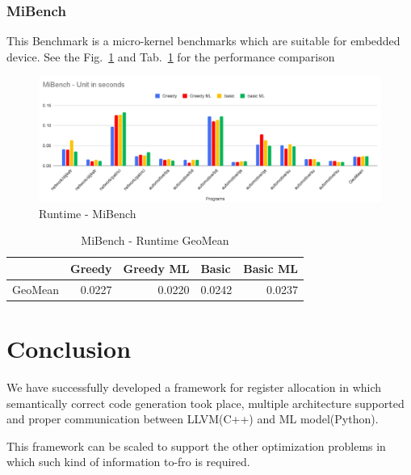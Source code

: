 \subsubsection{MiBench}
This Benchmark is a micro-kernel benchmarks which are suitable for embedded device.  See the Fig.~\ref{fig:mlra-mibench} and Tab.~\ref{tab:mlra:mibench} for the performance comparison

\begin{figure}[t]
    \centering
    \includegraphics[scale=0.4]{figures/chapter-5/MiBench.png}
    \caption{Runtime - MiBench}
     \label{fig:mlra-mibench}
\end{figure}

\begin{table}[h]
\begin{tabular}{|l|l|l|l|l|}
\hline
 & \textbf{Greedy} & \textbf{Greedy ML} & \textbf{Basic} & \textbf{Basic ML} \\ \hline
GeoMean & \multicolumn{1}{r|}{0.0227} & \multicolumn{1}{r|}{0.0220} & \multicolumn{1}{r|}{0.0242} & \multicolumn{1}{r|}{0.0237} \\ \hline
\end{tabular}
\centering
\caption{MiBench - Runtime GeoMean}
\label{tab:mlra:mibench}
\end{table}


\section{Conclusion}\label{sec:mlra:conclusion}
We have successfully developed a framework for register allocation in which semantically correct code generation took place, multiple architecture supported and proper communication between LLVM(C++) and ML model(Python).

This framework can be scaled to support the other optimization problems in which such kind of information to-fro is required.
